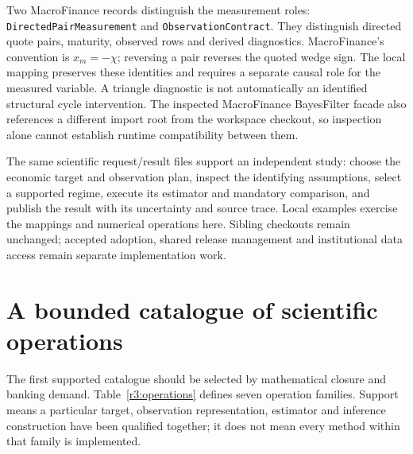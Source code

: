 Two MacroFinance records distinguish the measurement roles:
\texttt{DirectedPair\allowbreak Measurement} and
\texttt{Observation\allowbreak Contract}. They distinguish directed quote pairs, maturity,
observed rows and derived diagnostics. MacroFinance's convention is $x_m=-\chi$;
reversing a pair reverses the quoted wedge sign. The local mapping preserves
these identities and requires a separate causal role for the measured
variable. A triangle diagnostic is not automatically an identified structural
cycle intervention. The inspected MacroFinance BayesFilter facade also
references a different import root from the workspace checkout, so inspection
alone cannot establish runtime compatibility between them.

The same scientific request/result files support an independent study:
choose the economic target and observation plan, inspect the identifying
assumptions, select a supported regime, execute its estimator and mandatory
comparison, and publish the result with its uncertainty and source trace.
Local examples exercise the mappings and numerical operations here. Sibling
checkouts remain unchanged; accepted adoption, shared release management and
institutional data access remain separate implementation work.




\section{A bounded catalogue of scientific operations}
\label{r3:operation-catalogue}

The first supported catalogue should be selected by mathematical closure
and banking demand. Table~\ref{r3:operations} defines seven operation
families. Support means a particular target, observation representation,
estimator and inference construction have been qualified together;
it does not mean every method within that family is implemented.

